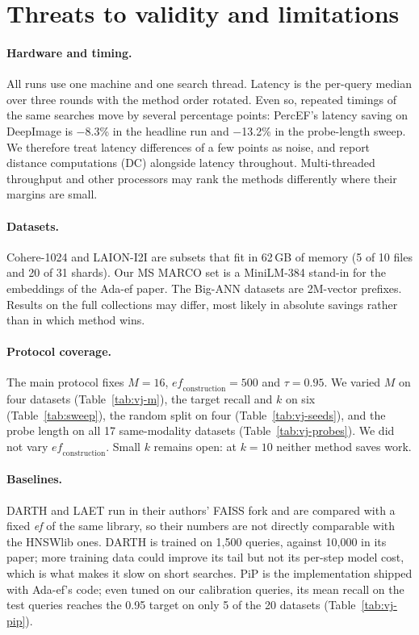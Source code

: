 \documentclass[twocolumn]{svjour3}
\newcommand{\ef}{\textit{ef}}
\begin{document}
\section{Threats to validity and limitations}\label{sec:limitations}

\paragraph{Hardware and timing.}
All runs use one machine and one search thread. Latency is the per-query median over three rounds
with the method order rotated. Even so, repeated timings of the same searches move by several
percentage points: PercEF's latency saving on DeepImage is $-$8.3\% in the headline run and
$-$13.2\% in the probe-length sweep. We therefore treat latency differences of a few points as
noise, and report distance computations (DC) alongside latency throughout. Multi-threaded
throughput and other processors may rank the methods differently where their margins are small.

\paragraph{Datasets.}
Cohere-1024 and LAION-I2I are subsets that fit in 62\,GB of memory (5 of 10 files and 20 of 31
shards). Our MS MARCO set is a MiniLM-384 stand-in for the embeddings of the Ada-ef paper. The
Big-ANN datasets are 2M-vector prefixes. Results on the full collections may differ, most likely in
absolute savings rather than in which method wins.

\paragraph{Protocol coverage.}
The main protocol fixes $M = 16$, $\mathit{ef}_{\mathrm{construction}} = 500$ and $\tau = 0.95$. We
varied $M$ on four datasets (Table~\ref{tab:vj-m}), the target recall and $k$ on six
(Table~\ref{tab:sweep}), the random split on four (Table~\ref{tab:vj-seeds}), and the probe length on
all 17 same-modality datasets (Table~\ref{tab:vj-probes}). We did not vary
$\mathit{ef}_{\mathrm{construction}}$. Small $k$ remains open: at $k = 10$ neither method saves work.

\paragraph{Baselines.}
DARTH and LAET run in their authors' FAISS fork and are compared with a fixed \ef{} of the same
library, so their numbers are not directly comparable with the HNSWlib ones. DARTH is trained on
1,500 queries, against 10,000 in its paper; more training data could improve its tail but not its
per-step model cost, which is what makes it slow on short searches. PiP is the implementation
shipped with Ada-ef's code; even tuned on our calibration queries, its mean recall on the test
queries reaches the 0.95 target on only 5 of the 20 datasets (Table~\ref{tab:vj-pip}).
\end{document}
